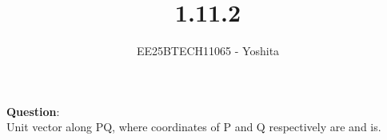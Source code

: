 \documentclass[journal]{IEEEtran}
\begin{document}

\vspace{3cm}

\title{1.11.2}
\author{EE25BTECH11065 - Yoshita}
{\let\newpage\relax\maketitle}

\renewcommand{\thefigure}{\theenumi}
\renewcommand{\thetable}{\theenumi}
\setlength{\intextsep}{10pt} %
\textbf{Question}:\\
    Unit vector along PQ, where coordinates of P and Q respectively are  and  is.\\
\bigskip
\end{document}
